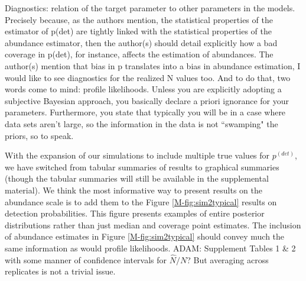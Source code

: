 \documentclass[12pt]{article}
\renewenvironment{quote}  %
              {\list{}{\rightmargin\leftmargin}\normalfont%
               \item\relax}
              {\endlist}
\newcommand{\adam}[1]{{\color{blue} ADAM: #1}}
\newcommand{\pdet}{p^{(det)}}
\begin{document}
Diagnostics: relation of the target parameter to other parameters in the models. Precisely because, as the authors mention, the statistical properties of the estimator of p(det) are tightly linked with the statistical properties of the abundance estimator, then the author(s) should detail explicitly how a bad coverage in p(det), for instance, affects the estimation of abundances. The author(s) mention that bias in p translates into a bias in abundance estimation, I would like to see diagnostics for the realized N values too. And to do that, two words come to mind: profile likelihoods. 
Unless you are explicitly adopting a subjective Bayesian approach, you basically declare a priori ignorance for your parameters.  Furthermore, you state that typically you will be in a case where data sets aren't large, so the information in the data is not ``swamping" the priors, so to speak.
\begin{quote}
With the expansion of our simulations to include multiple true values for $\pdet$, we have switched from tabular summaries of results to graphical summaries (though the tabular summaries will still be available in the supplemental material).
We think the most informative way to present results on the abundance scale is to add them to the Figure \ref{M-fig:sim2typical} results on detection probabilities.
This figure presents examples of entire posterior distributions rather than just median and coverage point estimates.
The inclusion of abundance estimates in Figure \ref{M-fig:sim2typical} should convey much the same information as would profile likelihoods.
\adam{Supplement Tables 1 \& 2 with some manner of confidence intervals for $\hat{N} / N$?  But averaging across replicates is not a trivial issue.}
\end{quote}
\end{document}
